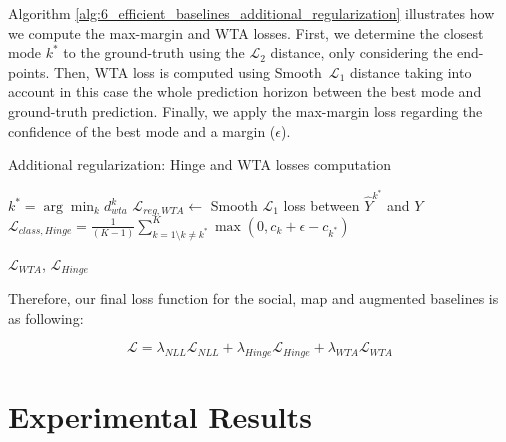 Algorithm \ref{alg:6_efficient_baselines_additional_regularization} illustrates how we compute the max-margin and \ac{WTA} losses. First, we determine the closest mode $k^{*}$ to the ground-truth using the $\mathcal{L}_2$ distance, only considering the end-points. Then, \ac{WTA} loss is computed using Smooth~$\mathcal{L}_1$ distance taking into account in this case the whole prediction horizon between the best mode and ground-truth prediction. Finally, we apply the max-margin loss regarding the confidence of the best mode and a margin ($\epsilon$).

\begin{algorithm}[H]
	\SetAlgoLined
	\footnotesize
	\caption{Additional regularization: Hinge and \ac{WTA} losses computation}
	\label{alg:6_efficient_baselines_additional_regularization}
	
	
	
	
	
	$k^* = \arg\min_{k} d_{wta}^{k}$\;
	$\mathcal{L}_{reg,WTA} \gets $ Smooth $\mathcal{L}_1$ loss between $\hat{Y}^{k^*}$ and $Y$\;
	$\mathcal{L}_{class,Hinge} = \frac{1}{(K-1)}\sum_{k=1 \setminus k \neq k^*}^{K} \max( 0, c_{k} + \epsilon - c_{k^*})$\;
	
	\Return $\mathcal{L}_{WTA}$, $\mathcal{L}_{Hinge}$\;
	
\end{algorithm}

Therefore, our final loss function for the social, map and augmented baselines is as following:

\begin{equation}
	\mathcal{L} = \lambda_{NLL} \mathcal{L}_{NLL} + \lambda_{Hinge} \mathcal{L}_{Hinge} + \lambda_{WTA} \mathcal{L}_{WTA}
	\label{eq:loss}
\end{equation}

\section{Experimental Results}
\label{sec:6_experimental_results}

